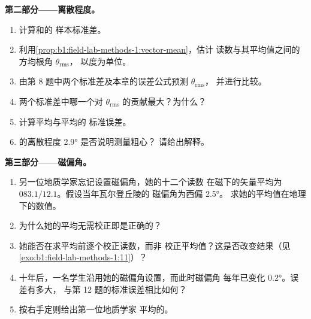 \begin{problem}
\medskip
\noindent\textbf{第二部分——离散程度。}
\begin{enumerate}[resume]
  \item 计算和的
        样本标准差。
  \item 利用\cref{prop:b1:field-lab-methods-1:vector-mean}，估计
        读数与其平均值之间的方均根角 $\theta_{\text{rms}}$，
        以度为单位。
  \item 由第 8 题中两个标准差及本章的误差公式预测 $\theta_{\text{rms}}$，
        并进行比较。
  \item 两个标准差中哪一个对
        $\theta_{\text{rms}}$ 的贡献最大？为什么？
  \item 计算平均与平均的
        标准误差。
  \item {}的离散程度 \ang{2.9} 是否说明测量粗心？
        请给出解释。
\end{enumerate}

\medskip
\noindent\textbf{第三部分——磁偏角。}
\begin{enumerate}[resume]
  \item 另一位地质学家忘记设置磁偏角，她的十二个读数
        在磁下的矢量平均为 $083.1/12.1$。假设当年瓦尔登丘陵的
        磁偏角为西偏 \ang{2.5}。
        求她的平均值在地理下的数值。
  \item 为什么她的平均无需校正即是正确的？
  \item 她能否在求平均前逐个校正读数，而非
        校正平均值？这是否改变结果（见\cref{exo:b1:field-lab-methods-1:11}）？
  \item 十年后，一名学生沿用她的磁偏角设置，而此时磁偏角
        每年已变化 \ang{0.2}。误差有多大，
        与第 12 题的标准误差相比如何？
  \item 按右手定则给出第一位地质学家
        平均的。
\end{enumerate}


\end{problem}
